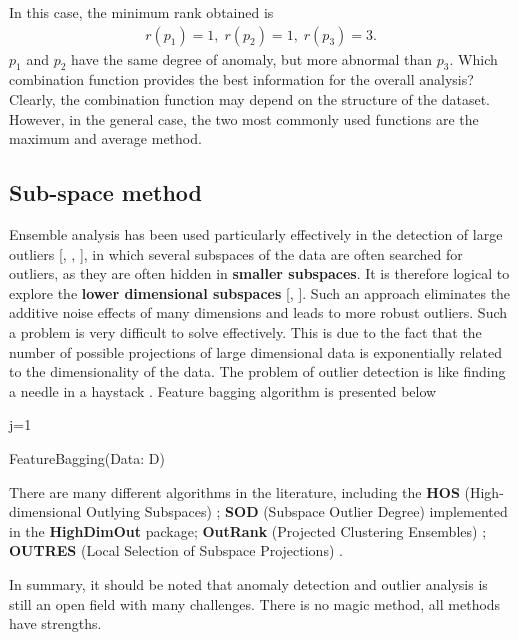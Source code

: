 In this case, the minimum rank obtained is
\begin{align*}
r\left(p_{1}\right)=1,\; r\left(p_{2}\right)=1,\; r \left(p_{3}\right)=3.
\end{align*}
$p_1$ and $p_2$ have the same degree of anomaly, but more abnormal than $p_3$. 
Which combination function provides the best information for the overall analysis? Clearly, the combination function may depend on the structure of the dataset. However, in the general case, the two most commonly used functions are the maximum and average method.
%
\subsection{Sub-space method}
%
%
Ensemble analysis has been used particularly effectively in the detection of large outliers [\cite{A8}, \cite{A13}, \cite{A14}], in which several subspaces of the data are often searched for outliers, as they are often hidden in \textbf{smaller subspaces}. It is therefore logical to explore the \textbf{lower dimensional subspaces} [\cite{A1}, \cite{A2}]. Such an approach eliminates the additive noise effects of many dimensions and leads to more robust outliers. Such a problem is very difficult to solve effectively. This is due to the fact that the number of possible projections of large dimensional data is exponentially related to the dimensionality of the data. The problem of outlier detection is like finding a needle in a haystack \cite{A14}.
Feature bagging algorithm is presented below
\begin{algorithm}
\SetAlgoLined
j=1\;
\caption{FeatureBagging(Data: D)}
\end{algorithm}

\noindent There are many different algorithms in the literature, including the \textbf{HOS} (High-dimensional Outlying Subspaces) \cite{Zhang}; \textbf{SOD} (Subspace Outlier Degree) \cite{Zi} implemented in the \textbf{HighDimOut} package; \textbf{OutRank} (Projected Clustering Ensembles) \cite{M1}; \textbf{OUTRES} (Local Selection of Subspace Projections) \cite{M3}.

In summary, it should be noted that anomaly detection and outlier analysis is still an open field with many challenges. There is no magic method, all methods have strengths. 
\afterpage{\FloatBarrier}